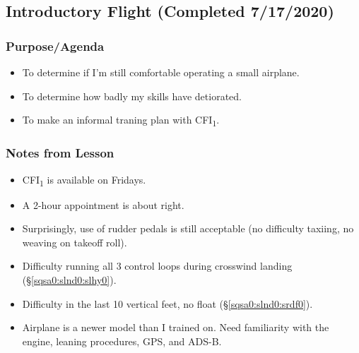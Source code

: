 \documentclass[letterpaper,10pt,titlepage]{article}
\begin{document}

\subsection{Introductory Flight (Completed 7/17/2020)}
\label{sfle0:sint0}



\subsubsection{Purpose/Agenda}
\label{sfle0:sint0:spov0}

\begin{itemize}
\item To determine if I'm still comfortable operating a small airplane.
\item To determine how badly my skills have detiorated.
\item To make an informal traning plan with CFI\textsubscript{1}.
\end{itemize}


\subsubsection{Notes from Lesson}
\label{sfle0:sint0:snff0}

\begin{itemize}
\item CFI\textsubscript{1} is available on Fridays.
\item A 2-hour appointment is about right.
\item Surprisingly, use of rudder pedals is still acceptable (no difficulty taxiing,
      no weaving on takeoff roll).
\item Difficulty running all 3 control loops during crosswind landing
      (\S{}\ref{sqsa0:slnd0:slhy0}).
\item Difficulty in the last 10 vertical feet, no float 
      (\S{}\ref{sqsa0:slnd0:srdf0}).
\item Airplane is a newer model than I trained on.  Need familiarity with the engine,
      leaning procedures, GPS, and ADS-B.	  
\end{itemize}


\end{document}
